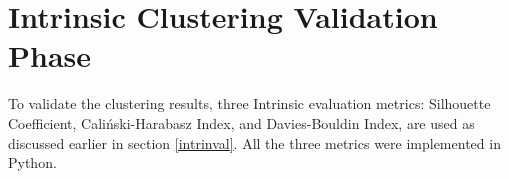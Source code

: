 







\section{Intrinsic Clustering Validation Phase}
To validate the clustering results, three Intrinsic evaluation metrics: Silhouette Coefficient, Caliński-Harabasz Index, and Davies-Bouldin Index, are used as discussed earlier in section \ref{intrinval}. All the three metrics were implemented in Python.  



